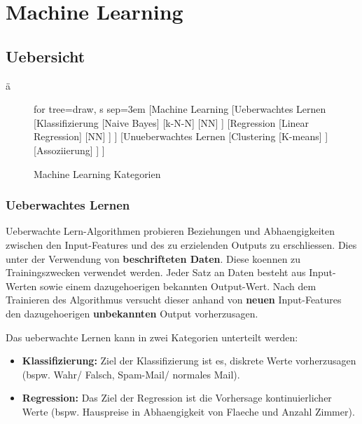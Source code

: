 \documentclass{article}
\begin{document}
\setcounter{page}{1}		%

%


\newpage
\section{Machine Learning}
\label{sec:ml}

\subsection{Uebersicht}

ä

\begin{figure}[H]
	\centering
	\label{fig:ml_overview}
	\begin{forest}
	for tree={draw, s sep=3em}
	[Machine Learning
	    [Ueberwachtes Lernen
	        [Klassifizierung
	            [Naive Bayes]
	             [k-N-N]
	             [NN]
	        ]
	        [Regression
	            [Linear Regression]
	            [NN]
	        ]
	    ]
	    [Unueberwachtes Lernen
	        [Clustering
	            [K-means]
	        ]
	        [Assoziierung]
	    ]
	]
	\end{forest}
	\caption{Machine Learning Kategorien}
\end{figure}

\subsubsection{Ueberwachtes Lernen}
\begin{flushleft}

Ueberwachte Lern-Algorithmen probieren Beziehungen und Abhaengigkeiten zwischen den Input-Features und des zu erzielenden Outputs zu erschliessen. Dies unter der Verwendung von \textbf{beschrifteten Daten}. Diese koennen zu Trainingszwecken verwendet werden. Jeder Satz an Daten besteht aus Input-Werten sowie einem dazugehoerigen bekannten Output-Wert. Nach dem Trainieren des Algorithmus versucht dieser anhand von \textbf{neuen} Input-Features den dazugehoerigen \textbf{unbekannten} Output vorherzusagen.
\linebreak

Das ueberwachte Lernen kann in zwei Kategorien unterteilt werden:

\begin{itemize}
	\item \textbf{Klassifizierung:} Ziel der Klassifizierung ist es, diskrete Werte vorherzusagen (bspw. Wahr/ Falsch, Spam-Mail/ normales Mail). 
	\item \textbf{Regression:} Das Ziel der Regression ist die Vorhersage kontinuierlicher Werte (bspw. Hauspreise in Abhaengigkeit von Flaeche und Anzahl Zimmer).
\end{itemize}

\end{flushleft}
\end{document}
